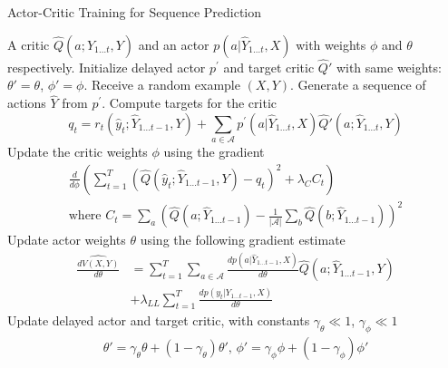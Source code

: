 \documentclass{article} %
\begin{document}
\begin{algorithm}
    \caption{Actor-Critic Training for Sequence Prediction}
    \label{algo:algo1}
    \begin{algorithmic}[1]
    \REQUIRE 
        A critic $\hat{Q}(a;\hat{Y}_{1 \ldots t}, Y)$
        and an actor $p(a|\hat{Y}_{1 \ldots t}, X)$ with
        weights $\phi$ and $\theta$ respectively.
    \STATE Initialize delayed actor $p^{'}$ 
    and target critic $\hat{Q}'$ with same weights: $\theta' = \theta$, $\phi' = \phi$.
    \STATE Receive a random example $(X, Y)$.
    \STATE Generate a sequence of actions $\hat{Y}$ from $p^{'}$.
    \STATE Compute targets for the critic
    \begin{equation*}
        q_t = r_t(\hat{y}_t;\hat{Y}_{1 \ldots t - 1}, Y)
        + \sum\limits_{a \in \mathcal{A}}
        p^{'}(a|\hat{Y}_{1 \ldots t}, X)
        \hat{Q}'(a;\hat{Y}_{1 \ldots t}, Y)
    \end{equation*}       
    \STATE Update the critic weights $\phi$ using the gradient
    \begin{align*}
    \frac{d}{d\phi}\left(
        \sum_{t=1}^{T} 
        \left(\hat{Q}(\hat{y}_t;\hat{Y}_{1 \ldots t - 1}, Y) - q_t \right)^2
        + \lambda_C C_t
    \right) \\
    \textrm{where } C_t = \sum_{a}\left( 
        \hat{Q}(a; \hat{Y}_{1 \ldots t-1}) - 
        \frac{1}{|\mathcal{A}|}\sum_{b}\hat{Q}(b; \hat{Y}_{1 \ldots t-1}) 
    \right)^2
    \end{align*}
    \STATE Update actor weights $\theta$ using the following gradient estimate
    \begin{align*}
        \widehat{\frac{dV(X,Y)}{d\theta}} &=
        \sum\limits_{t=1}^T
        \sum\limits_{a \in \mathcal{A}}
        \frac{d p(a|\hat{Y}_{1 \ldots t - 1}, X)}{d \theta}
         \hat{Q}(a;\hat{Y}_{1 \ldots t - 1}, Y)
\\
         &+ \lambda_{LL} \sum\limits_{t=1}^T 
        \frac{d p(y_t|Y_{1 \ldots t - 1}, X)}{d \theta}
    \end{align*}
    \STATE Update delayed actor and target critic, with constants 
    $\gamma_{\theta} \ll 1$, $\gamma_{\phi} \ll 1$
        \begin{align*}
            \theta' = \gamma_{\theta} \theta + (1 - \gamma_{\theta}) \theta',\, 
            \phi' = \gamma_{\phi} \phi + (1 - \gamma_{\phi}) \phi'
        \end{align*}
    \ENDWHILE
    \end{algorithmic}
\end{algorithm}
\end{document}
